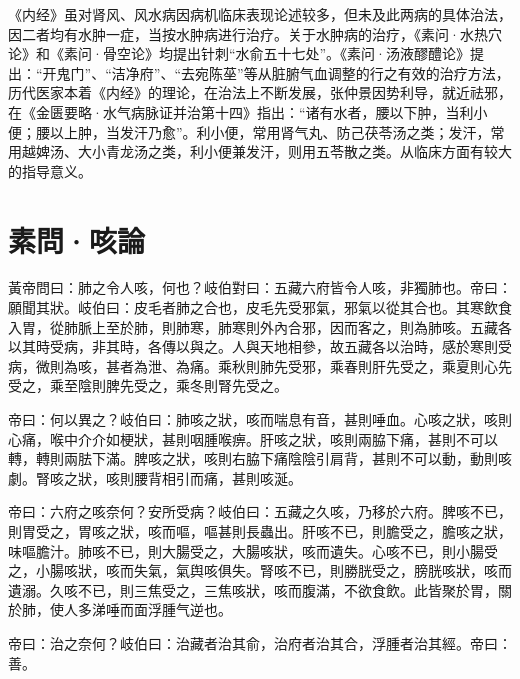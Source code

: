 \documentclass[draft,12pt]{ctexbook}
\begin{document}


《内经》虽对肾风、风水病因病机临床表现论述较多，但未及此两病的具体治法，因二者均有水肿一症，当按水肿病进行治疗。关于水肿病的治疗，《素问·水热穴论》和《素问·骨空论》均提出针刺“水俞五十七处”。《素问·汤液醪醴论》提出：“开鬼门”、“洁净府”、“去宛陈莝”等从脏腑气血调整的行之有效的治疗方法，历代医家本着《内经》的理论，在治法上不断发展，张仲景因势利导，就近祛邪，在《金匮要略·水气病脉证并治第十四》指出：“诸有水者，腰以下肿，当利小便；腰以上肿，当发汗乃愈”。利小便，常用肾气丸、防己茯苓汤之类；发汗，常用越婢汤、大小青龙汤之类，利小便兼发汗，则用五苓散之类。从临床方面有较大的指导意义。

\section{素問·咳論}%


\begin{yuanwen}
黃帝問曰：肺之令人咳，何也？岐伯對曰：五藏六府皆令人咳，非獨肺也。帝曰：願聞其狀。岐伯曰：皮毛者肺之合也，皮毛先受邪氣，邪氣以從其合也。其寒飲食入胃，從肺脈上至於肺，則肺寒，肺寒則外內合邪，因而客之，則為肺咳。五藏各以其時受病，非其時，各傳以與之。人與天地相參，故五藏各以治時，感於寒則受病，微則為咳，甚者為泄、為痛。乘秋則肺先受邪，乘春則肝先受之，乘夏則心先受之，乘至陰則脾先受之，乘冬則腎先受之。

帝曰：何以異之？岐伯曰：肺咳之狀，咳而喘息有音，甚則唾血。心咳之狀，咳則心痛，喉中介介如梗狀，甚則咽腫喉痹。肝咳之狀，咳則兩脇下痛，甚則不可以轉，轉則兩胠下滿。脾咳之狀，咳則右脇下痛陰陰引肩背，甚則不可以動，動則咳劇。腎咳之狀，咳則腰背相引而痛，甚則咳涎。

帝曰：六府之咳奈何？安所受病？岐伯曰：五藏之久咳，乃移於六府。脾咳不已，則胃受之，胃咳之狀，咳而嘔，嘔甚則長蟲出。肝咳不已，則膽受之，膽咳之狀，味嘔膽汁。肺咳不已，則大腸受之，大腸咳狀，咳而遺失。心咳不已，則小腸受之，小腸咳狀，咳而失氣，氣舆咳俱失。腎咳不已，則勝胱受之，膀胱咳狀，咳而遺溺。久咳不已，則三焦受之，三焦咳狀，咳而腹滿，不欲食飲。此皆聚於胃，關於肺，使人多涕唾而面浮腫气逆也。

帝曰：治之奈何？岐伯曰：治藏者治其俞，治府者治其合，浮腫者治其經。帝曰：善。
\end{yuanwen}

\end{document}

